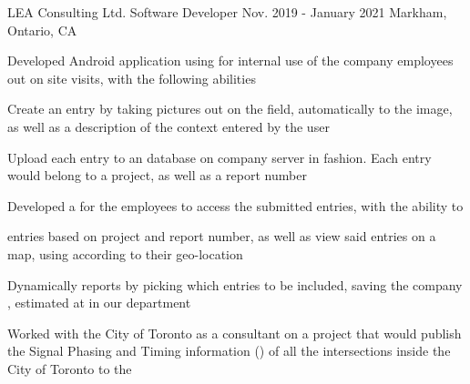 

\begin{cventries}

  \cventry
  {LEA Consulting Ltd.} %
  {Software Developer} %
  {Nov. 2019 - January 2021} %
  {Markham, Ontario, CA} %
  {
    \begin{cvitems} %
      \item {Developed Android application using  for internal use of the company employees out on site visits, with the following abilities}
        \begin{cvsubitems}
          \item {Create an entry by taking pictures out on the field, automatically  to the image, as well as a description of the context entered by the user}
          \item {Upload each entry to an  database on company server in  fashion. Each entry would belong to a project, as well as a report number}
        \end{cvsubitems}
      \item {Developed a  for the employees to access the submitted entries, with the ability to}
        \begin{cvsubitems}
          \item { entries based on project and report number, as well as view said entries on a map, using  according to their geo-location}
          \item {Dynamically  reports by picking which entries to be included, saving the company , estimated at  in our department}
        \end{cvsubitems}
      \item {Worked with the City of Toronto as a consultant on a project that would publish the Signal Phasing and Timing information () of all the intersections inside the City of Toronto to the }

\end{cvitems}}
\end{cventries}

